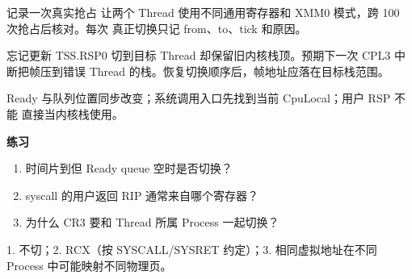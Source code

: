 
\begin{experimentbox}{记录一次真实抢占}
让两个 Thread 使用不同通用寄存器和 XMM0 模式，跨 100 次抢占后核对。每次
真正切换只记 from、to、tick 和原因。
\end{experimentbox}

\begin{faultinjectionbox}{忘记更新 TSS.RSP0}
切到目标 Thread 却保留旧内核栈顶。预期下一次 CPL3 中断把帧压到错误 Thread
的栈。恢复切换顺序后，帧地址应落在目标栈范围。
\end{faultinjectionbox}

\begin{pitfallbox}
Ready 与队列位置同步改变；系统调用入口先找到当前 CpuLocal；用户 RSP 不能
直接当内核栈使用。
\end{pitfallbox}

\textbf{练习}
\begin{enumerate}[leftmargin=2.2em]
  \item 时间片到但 Ready queue 空时是否切换？
  \item syscall 的用户返回 RIP 通常来自哪个寄存器？
  \item 为什么 CR3 要和 Thread 所属 Process 一起切换？
\end{enumerate}
\begin{answerbox}
1. 不切；2. RCX（按 SYSCALL/SYSRET 约定）；3. 相同虚拟地址在不同 Process
中可能映射不同物理页。
\end{answerbox}
